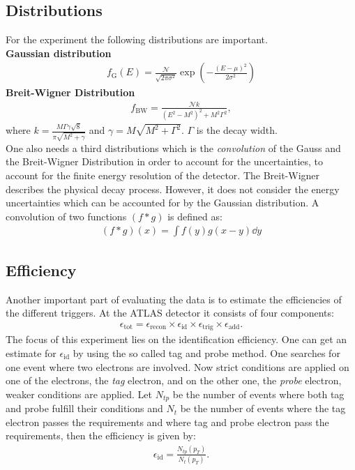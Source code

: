 \documentclass[12pt, a4paper, bibliography=totoc]{scrartcl}
\begin{document}
\begin{multicols}{2}
\subsection{Distributions}
For the experiment the following distributions are important.\\
\textbf{Gaussian distribution}
\begin{align}
    f_{\text{G}} (E) = \frac{\mathcal{N}}{\sqrt{2 \pi \sigma^2}} \exp \left( - \frac{(E - \mu )^2}{2 \sigma^2} \right)
\end{align}
\textbf{Breit-Wigner Distribution}
\begin{align}
    f_{\text{BW}} = \frac{\mathcal{N} k}{(E^2 - M^2)^2 + M^2 \Gamma^2} ,
\end{align}
where $k = \frac{M\Gamma \gamma \sqrt{8}}{\pi \sqrt{M^2 + \gamma}}$ and $\gamma = M \sqrt{M^2 + \Gamma^2}$. $\Gamma$ is the decay width.\\
One also needs a third distributions which is the \textit{convolution} of the Gauss and the Breit-Wigner Distribution in order to account for the uncertainties, to account for the finite energy resolution of the detector. 
The Breit-Wigner describes the physical decay process. 
However, it does not consider the energy uncertainties which can be accounted for by the Gaussian distribution.
A convolution of two functions $(f \ast g)$ is defined as:
\begin{align}
    (f \ast g) (x) = \int f(y)g(x-y)\dd y
\end{align}

\subsection{Efficiency}
Another important part of evaluating the data is to estimate the efficiencies of the different triggers.
At the ATLAS detector it consists of four components:
\begin{align}
     \epsilon_{\text{tot}} =  \epsilon_{\text{recon}} \times \epsilon_{\text{id}} \times \epsilon_{\text{trig}} \times \epsilon_{\text{add}}  .
\end{align}
The focus of this experiment lies on the identification efficiency.
One can get an estimate for $\epsilon_{\text{id}}$ by using the so called tag and probe method.
One searches for one event where two electrons are involved. 
Now strict conditions are applied on one of the electrons, the \textit{tag} electron, 
and on the other one, the \textit{probe} electron, weaker conditions are applied.
Let $N_{tp}$ be the number of events where both tag and probe fulfill their conditions and $N_t$ be the number of events where the tag electron passes the requirements and where tag and probe electron pass the requirements, then the efficiency is given by:
\begin{align}
    \epsilon_{\text{id}} = \frac{N_{tp} (p_T)}{N_t(p_T)}.
\end{align}



\end{multicols}
\end{document}

